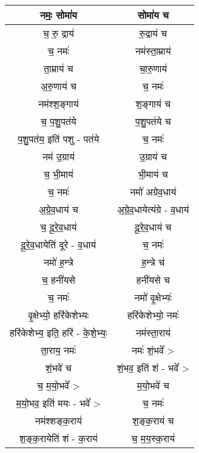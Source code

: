 \subsection{}
{\centering
\begin{longtable}{|c|c|}
\hline
नमः॒ सोमा॑य               & सोमा॑य च\\
\hline
च॒ रु॒ द्राय॑                & रु॒द्राय॑ च\\
\hline
च॒ नमः॑                   & नम॑स्ता॒म्राय॑\\
\hline
ता॒म्राय॑ च                & चा॒रु॒णाय॑\\
\hline
अ॒रु॒णाय॑ च                 & च॒ नमः॑\\
\hline
नम॑श्श॒ङ्गाय॑                & श॒ङ्गाय॑ च\\
\hline
च॒ प॒शु॒पत॑ये                 & प॒शु॒पत॑ये च\\
\hline
प॒शु॒पत॑य॒ इति॑ पशु - पत॑ये      & च॒ नमः॑\\
\hline
नम॑ उ॒ग्राय॑                & उ॒ग्राय॑ च\\
\hline
च॒ भी॒माय॑                 & भी॒माय॑ च\\
\hline
च॒ नमः॑                   & नमो॑ अग्रेव॒धाय॑\\
\hline
अ॒ग्रे॒व॒धाय॑ च               & अ॒ग्रे॒व॒धायेत्य॑ग्रे - व॒धाय॑\\
\hline
च॒ दू॒रे॒व॒धाय॑                & दू॒रे॒व॒धाय॑ च\\
\hline
दू॒रे॒व॒धायेति॑ दूरे - व॒धाय॑      & च॒ नमः॑\\
\hline
नमो॑ ह॒न्त्रे                & ह॒न्त्रे च॑\\
\hline
च॒ हनी॑यसे                 & हनी॑यसे च\\
\hline
च॒ नमः॑                   & नमो॑ वृ॒क्षेभ्यः॑\\
\hline
वृ॒क्षेभ्यो॒ हरि॑केशेभ्यः         & हरि॑केशेभ्यो॒ नमः॑\\
\hline
हरि॑केशेभ्य॒ इति॒ हरि॑ - के॒शे॒भ्यः॒ & नम॑स्ता॒राय॑\\
\hline
ता॒राय॒ नमः॑               & नमः॑ शं॒भवे᳚ >\\
\hline
शं॒भवे॑ च                   & शं॒भव॒ इति॑ शं - भवे᳚ >\\
\hline
च॒ म॒यो॒भवे᳚ >               & म॒यो॒भवे॑ च\\
\hline
म॒यो॒भव॒ इति॑ मयः - भवे᳚ >    & च॒ नमः॑\\
\hline
नम॑श्शङ्क॒राय॑               & श॒ङ्क॒राय॑ च\\
\hline
श॒ङ्क॒रायेति॑ शं - क॒राय॑       & च॒ म॒य॒स्क॒राय॑\\

\end{longtable}}
